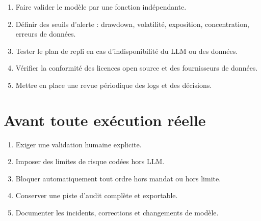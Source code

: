 \begin{enumerate}
    \item Faire valider le modèle par une fonction indépendante.
    \item Définir des seuils d'alerte : drawdown, volatilité, exposition, concentration, erreurs de données.
    \item Tester le plan de repli en cas d'indisponibilité du LLM ou des données.
    \item Vérifier la conformité des licences open source et des fournisseurs de données.
    \item Mettre en place une revue périodique des logs et des décisions.
\end{enumerate}

\section{Avant toute exécution réelle}

\begin{enumerate}
    \item Exiger une validation humaine explicite.
    \item Imposer des limites de risque codées hors LLM.
    \item Bloquer automatiquement tout ordre hors mandat ou hors limite.
    \item Conserver une piste d'audit complète et exportable.
    \item Documenter les incidents, corrections et changements de modèle.
\end{enumerate}

